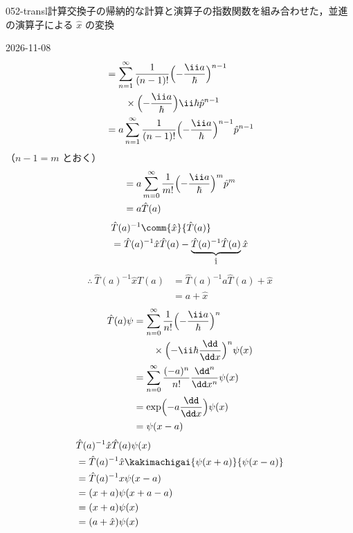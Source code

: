 \documentclass[uplatex,dvipdfmx,a4paper,11pt]{jsarticle}
\begin{document}
\begin{mondai}{052-transl}{計算}{交換子の帰納的な計算と演算子の指数関数を組み合わせた，並進の演算子による $\hat{x}$ の変換}
\begin{kotaeutsushi}{2026-11-08}
\begin{align*}
&=\sum_{n=1}^{\infty}\frac{1}{(n-1)!}\Bigl(-\frac{\ii a}{\hbar}\Bigr)^{n-1}\\
&\qquad\times\Bigl(-\frac{\ii a}{\hbar}\Bigr)\ii\hbar\hat{p}^{n-1}\\
&=a\sum_{n=1}^{\infty}\frac{1}{(n-1)!}\Bigl(-\frac{\ii a}{\hbar}\Bigr)^{n-1}\hat{p}^{n-1}
\end{align*}
（$n-1=m$ とおく）
\begin{align*}
&=a\sum_{m=0}^{\infty}\frac{1}{m!}\Bigl(-\frac{\ii a}{\hbar}\Bigr)^{m}\hat{p}^{m}\\
&=a\hat{T}(a)
\end{align*}
\begin{align*}
&\hat{T}(a)^{-1}\comm{\hat{x}}{\hat{T}(a)}\\
&=\hat{T}(a)^{-1}\hat{x}\hat{T}(a)-\underbrace{\hat{T}(a)^{-1}\hat{T}(a)}_{\hat{1}}\hat{x}
\end{align*}
\begin{align*}
\therefore\ \hat{T}(a)^{-1}\hat{x}\hat{T}(a)&=\hat{T}(a)^{-1}a\hat{T}(a)+\hat{x}\\
&=a+\hat{x}
\end{align*}
\begin{align*}
\hat{T}(a)\psi&=\sum_{n=0}^{\infty}\frac{1}{n!}\Bigl(-\frac{\ii a}{\hbar}\Bigr)^{n}\\
&\qquad\times\Bigl(-\ii\hbar\frac{\dd}{\dd x}\Bigr)^{n}\psi(x)\\
&=\sum_{n=0}^{\infty}\frac{(-a)^{n}}{n!}\frac{\dd^{n}}{\dd x^{n}}\psi(x)\\
&=\exp\Bigl(-a\frac{\dd}{\dd x}\Bigr)\psi(x)\\
&=\psi(x-a)
\end{align*}
\begin{align*}
&\hat{T}(a)^{-1}\hat{x}\hat{T}(a)\psi(x)\\
&=\hat{T}(a)^{-1}\hat{x}\kakimachigai{\psi(x+a)}{\psi(x-a)}\\
&=\hat{T}(a)^{-1}x\psi(x-a)\\
&=(x+a)\psi(x+a-a)\\
&=(x+a)\psi(x)\\
&=(a+\hat{x})\psi(x)
\end{align*}
\end{kotaeutsushi}
\end{mondai}

\noteowari
\end{document}
